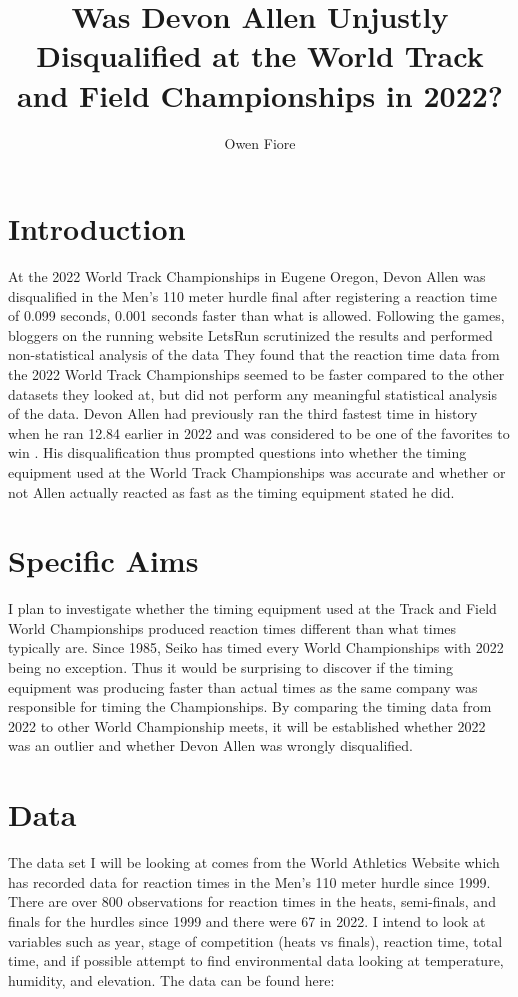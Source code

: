 \documentclass[12pt]{article}
\title{Was Devon Allen Unjustly Disqualified at the World Track and Field Championships in 2022?}
\author{
Owen Fiore
}
\begin{document}
\maketitle

\section{Introduction}

At the 2022 World Track Championships in Eugene Oregon, Devon Allen was disqualified in the
Men’s 110 meter hurdle final after registering a reaction time of 0.099 seconds, 0.001 
seconds faster than what is allowed.  Following the games, bloggers on the running website 
LetsRun scrutinized the results and performed non-statistical analysis of the data \citep{Johnson}
They found that the reaction time data from the 2022 World Track Championships seemed to be faster 
compared to the other datasets they looked at, but did not perform any meaningful statistical 
analysis of the data.  Devon Allen had previously ran the third fastest time in history when 
he ran 12.84 earlier in 2022 and was considered to be one of the favorites to win \citep{Preview}.  His 
disqualification thus prompted questions into whether the timing equipment used at the World
Track Championships was accurate and whether or not Allen actually reacted as fast as the 
timing equipment stated he did.

\section{Specific Aims}
I plan to investigate whether the timing equipment used at the Track and Field World Championships
 produced reaction times different than what times typically are.  Since 1985, Seiko has timed 
 every World Championships with 2022 being no exception\citep{Seiko}.  Thus it would be surprising to discover
 if the timing equipment was producing faster than actual times as the same company was responsible
 for timing the Championships.  By comparing the timing data from 2022 to other World Championship 
 meets, it will be established whether 2022 was an outlier and whether Devon Allen was wrongly 
 disqualified.

\section{Data}

The data set I will be looking at comes from the World Athletics Website which has recorded data
for reaction times in the Men’s 110 meter hurdle since 1999. There are over 800 observations for
reaction times in the heats, semi-finals, and finals for the hurdles since 1999 and there were
67 in 2022.  I intend to look at variables such as year, stage of competition (heats vs finals),
reaction time, total time, and if possible attempt to find environmental data looking at 
temperature, humidity, and elevation.  The data can be found here: \citet{WAData}
\end{document}
